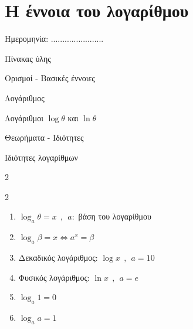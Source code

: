 \documentclass[twoside,nofonts,internet,math,spyros]{frontisthrio}
\begin{document}
\newpage
\section{Η έννοια του λογαρίθμου}
\begin{flushright}
\faCalendar* Ημερομηνία: .......................
\end{flushright}
\begin{mybox}[mysubtitle]{Πίνακας ύλης}
\begin{tcbraster}[raster columns=2,raster equal height]
\begin{myleftbox}{Ορισμοί - Βασικές έννοιες\ \ \faBook}
\begin{arithmisi}[itemsep=0mm]
\item Λογάριθμος
\item Λογάριθμοι $ \log{\theta} $ και $ \ln{\theta} $
\end{arithmisi}
\end{myleftbox}
\begin{myrightbox}{Θεωρήματα - Ιδιότητες\ \ \faTools}
\begin{arithmisi}[itemsep=0mm]
\item Ιδιότητες λογαρίθμων
\end{arithmisi}
\end{myrightbox}
\end{tcbraster}
\begin{multicols}{2}
\begin{todolist}[itemsep=0mm]
\item 
\end{todolist}
\end{multicols}
\begin{multicols}{2}
\begin{enumerate}[itemsep=0mm,leftmargin=3mm]
\item $ \log_{a}{\theta}=x\ \ ,\ \ a: $ βάση του λογαρίθμου
\item $ \log_{a}{\beta}=x\Leftrightarrow a^x=\beta $
\item Δεκαδικός λογάριθμος: $ \log{x}\ \ ,\ \ a=10 $
\item Φυσικός λογάριθμος: $ \ln{x}\ \ ,\ \ a=e $
\item $ \log_{a}{1}=0 $
\item $ \log_{a}{a}=1 $
\end{enumerate}
\end{multicols}
\begin{center}

\end{center}
\end{mybox}
\end{document}
